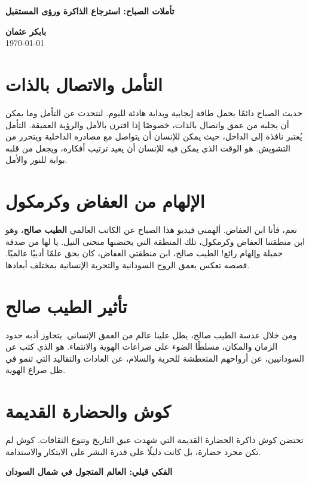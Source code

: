 \documentclass[12pt]{article}
\begin{document}
\begin{center}
	{\Huge\textbf{\textcolor{titleColor}{ تأملات الصباح: استرجاع الذاكرة ورؤى المستقبل  }}}

    \vspace{0.5cm}
    
    \textbf{\textcolor{emphasisColor}{بابكر عثمان}} \\
    \vspace{0.2cm}
    \today
\end{center}

\section{التأمل والاتصال بالذات}
حديث الصباح دائمًا يحمل طاقة إيجابية وبداية هادئة لليوم. لنتحدث عن التأمل وما يمكن أن يجلبه من عمق واتصال بالذات، خصوصًا إذا اقترن بالأمل والرؤية العميقة.  
التأمل يُعتبر نافذة إلى الداخل، حيث يمكن للإنسان أن يتواصل مع مصادره الداخلية ويتحرر من التشويش. هو الوقت الذي يمكن فيه للإنسان أن يعيد ترتيب أفكاره، ويجعل من قلبه بوابة للنور والأمل.

\section{الإلهام من العفاض وكرمكول}
نعم، فأنا ابن العفاض. ألهمني فيديو هذا الصباح عن الكاتب العالمي \textbf{الطيب صالح}، وهو ابن منطقتنا العفاض وكرمكول، تلك المنطقة التي يحتضنها منحنى النيل.  
يا لها من صدفة جميلة وإلهام رائع! الطيب صالح، ابن منطقتي العفاض، كان بحق علمًا أدبيًا عالميًا. قصصه تعكس بعمق الروح السودانية والتجربة الإنسانية بمختلف أبعادها.  

\section{تأثير الطيب صالح}
ومن خلال عدسة الطيب صالح، يطل علينا عالم من العمق الإنساني. يتجاوز أدبه حدود الزمان والمكان، مسلطًا الضوء على صراعات الهوية والانتماء.  
هو الذي كتب عن السودانيين، عن أرواحهم المتعطشة للحرية والسلام، عن العادات والتقاليد التي تنمو في ظل صراع الهوية.

\section{كوش والحضارة القديمة}
تحتضن كوش ذاكرة الحضارة القديمة التي شهدت عبق التاريخ وتنوع الثقافات. كوش لم تكن مجرد حضارة، بل كانت دليلًا على قدرة البشر على الابتكار والاستدامة.  

\begin{center}
    {\Huge\textbf{\color{titleColor} الفكي قيلي: العالم المتجول في شمال السودان}}  
    \vspace{0.5cm}
\end{center}
\end{document}
